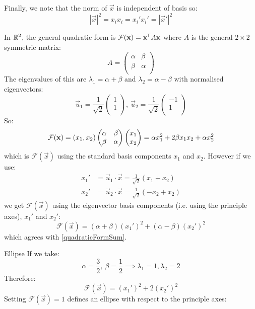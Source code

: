 \documentclass[../main.tex]{subfiles}
\begin{document}
Finally, we note that the norm of $\vec{x}$ is independent of basis so:
\[
  |\vec{x}|^2 = x_i x_i = x_i' x_i' = |\vec{x}'|^2
\]
\begin{example}
  In $\R^2$, the general quadratic form is $\mathcal{F}(\vec{x}) = \vec{x}^{\trans}A\vec{x}$ where $A$ is the general $2 \times 2$ symmetric matrix:
  \[
    A = \begin{pmatrix}
    \alpha & \beta \\
    \beta & \alpha \\
    \end{pmatrix}
  \]
  The eigenvalues of this are $\lambda_1 = \alpha + \beta$ and $\lambda_2 = \alpha - \beta$ with normalised eigenvectors:
  \[
    \vec{u}_1 = \frac{1}{\sqrt{2}}\begin{pmatrix}
    1 \\
    1 \\
    \end{pmatrix},\
    \vec{u}_2 = \frac{1}{\sqrt{2}}\begin{pmatrix}
    -1 \\
    1 \\
    \end{pmatrix}
  \]
  So:
  \[
    \mathcal{F}(\vec{x}) = (x_1, x_2) \begin{pmatrix}
      \alpha & \beta \\
      \beta & \alpha \\
    \end{pmatrix}
    \begin{pmatrix}
      x_1 \\
      x_2 \\
    \end{pmatrix} =
    \alpha x^{2}_{1} + 2\beta x_1 x_2 + \alpha x^{2}_{2} \\
  \]
  which is $\mathcal{F}(\vec{x})$ using the standard basis components $x_1$ and $x_2$.
  However if we use:
  \begin{align*}
    x_1' &= \vec{u}_1 \cdot \vec{x} = \frac{1}{\sqrt{2}}(x_1 + x_2) \\
    x_2' &= \vec{u}_2 \cdot \vec{x} = \frac{1}{\sqrt{2}}(-x_2 + x_2)
  \end{align*}
  we get $\mathcal{F(\vec{x})}$ using the eigenvector basis components (i.e. using the principle axes), $x_1'$ and $x_2'$:
  \[
    \mathcal{F}(\vec{x}) = (\alpha + \beta)(x_1')^2 + (\alpha - \beta)(x_2')^2
  \]
  which agrees with \cref{quadraticFormSum}.
  \begin{proofcases}
    \begin{case}{Ellipse}
      If we take:
      \[
        \alpha = \frac{3}{2},\ \beta = \frac{1}{2} \implies \lambda_1 = 1, \lambda_2 = 2
      \]
      Therefore:
      \[
        \mathcal{F}(\vec{x}) = (x_1')^2 + 2(x_2')^2
      \]
      Setting $\mathcal{F}(\vec{x}) = 1$ defines an ellipse with respect to the principle axes:
      \begin{center}
\end{center}
\end{case}
\end{proofcases}
\end{example}
\end{document}
